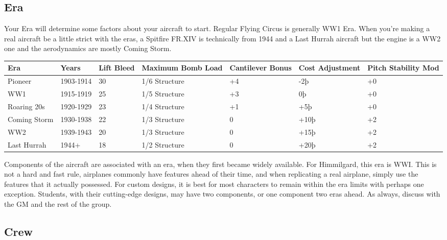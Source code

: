 \documentclass{article}
\begin{document}
\subsection{Era}
\label{_Era}

Your Era will determine some factors about your aircraft to start.
Regular Flying Circus is generally WW1 Era. When you're making a real
aircraft be a little strict with the eras, a Spitfire FR.XIV is
technically from 1944 and a Last Hurrah aircraft but the engine is a WW2
one and the aerodynamics are mostly Coming Storm.

\begin{tabular}{|l|l|l|l|l|l|l|}
    \hline
    Era          & Years               & Lift Bleed & Maximum Bomb Load & Cantilever Bonus & Cost
    Adjustment   & Pitch Stability Mod                                                                 \\\hline
    Pioneer      & 1903-1914           & 30         & 1/6 Structure     & +4               & -2þ  & +0 \\\hline
    WW1          & 1915-1919           & 25         & 1/5 Structure     & +3               & 0þ   & +0 \\\hline
    Roaring 20s  & 1920-1929           & 23         & 1/4 Structure     & +1               & +5þ  & +0 \\\hline
    Coming Storm & 1930-1938           & 22         & 1/3 Structure     & 0                & +10þ & +2 \\\hline
    WW2          & 1939-1943           & 20         & 1/3 Structure     & 0                & +15þ & +2 \\\hline
    Last Hurrah  & 1944+               & 18         & 1/2 Structure     & 0                & +20þ & +2 \\\hline
\end{tabular}

Components of the aircraft are associated with an era, when they
first became widely available. For Himmilgard, this era is WWI. This is
not a hard and fast rule, airplanes commonly have features ahead of
their time, and when replicating a real airplane, simply use the
features that it actually possessed. For custom designs, it is best for
most characters to remain within the era limits with perhaps one
exception. Students, with their cutting-edge designs, may have two
components, or one component two eras ahead. As always, discuss with the
GM and the rest of the group.

\subsection{Crew}
\label{_Crew}
\end{document}
